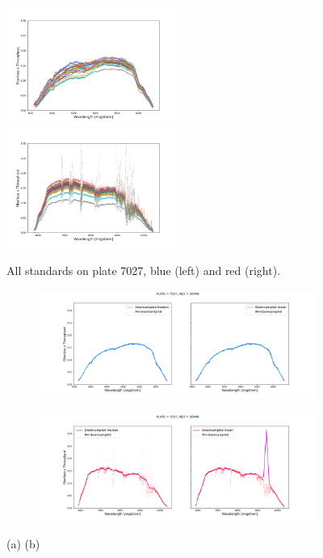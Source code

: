 \begin{figure}[h]
    \centering
    \includegraphics[width=0.495\textwidth]{images/specsim/all_standards_blue.png}
    \includegraphics[width=0.495\textwidth]{images/specsim/all_standards_red.png}
    \caption{All standards on plate 7027, blue (left) and red (right).}
    \label{fig:all_stds}
\end{figure}

\begin{figure}
\centering
\begin{subfigure}[b]{0.55\textwidth}
\centering
   \includegraphics[width=1\textwidth]{images/specsim/downsampled_blue_7027_56448.png}
   \caption{}
\end{subfigure}

\begin{subfigure}[b]{0.55\textwidth}
\centering
   \includegraphics[width=1\textwidth]{images/specsim/downsampled_red_7027_56448.png}
   \caption{}
\end{subfigure}
\caption[]{(a) (b)}
\label{fig:downsampled}
\end{figure}


